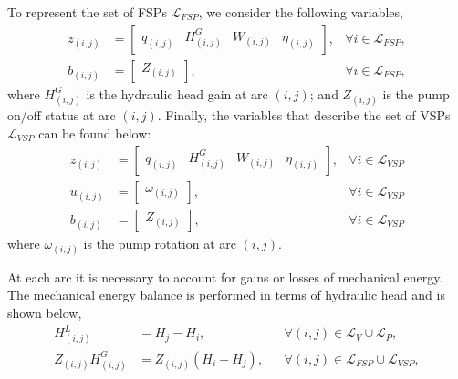     To represent the set of FSPs $\mathcal{L}_{FSP}$, we consider the following variables,
    \begin{subequations}
        \begin{alignat}{2}
            z_{(i,j)} &= \left[\begin{array}{cccc}
                q_{(i,j)} & H^G_{(i,j)} & W_{(i,j)} & \eta_{(i,j)}
            \end{array}\right], & \forall i \in \mathcal{L}_{FSP},
            \\
            b_{(i,j)} &= \left[\begin{array}{c}
                Z_{(i,j)}
            \end{array}\right], & \forall i \in \mathcal{L}_{FSP},
            \end{alignat}
    \end{subequations}
    where $H^G_{(i,j)}$ is the hydraulic head gain at arc ${(i,j)}$; 
    and $Z_{(i,j)}$ is the pump on/off status at arc ${(i,j)}$. 
    Finally, the variables that describe the set of VSPs $\mathcal{L}_{VSP}$ can be found below:
    \begin{subequations}
        \begin{alignat}{2}
            z_{(i,j)} &= \left[\begin{array}{cccc}
                q_{(i,j)} & H^G_{(i,j)} & W_{(i,j)} & \eta_{(i,j)}
            \end{array}\right], & \forall i \in \mathcal{L}_{VSP}  
            \\
            u_{(i,j)} & = \left[\begin{array}{c}
                \omega_{(i,j)}
            \end{array}\right], & \forall i \in \mathcal{L}_{VSP}  
            \\
            b_{(i,j)} &= \left[\begin{array}{ccc}
                Z_{(i,j)}
            \end{array}\right], & \forall i \in \mathcal{L}_{VSP}
            \end{alignat}
    \end{subequations}
    where $\omega_{(i,j)}$ is the pump rotation at arc $(i,j)$.
    \par At each arc it is necessary to account for gains or losses of mechanical energy. The mechanical energy balance is performed in terms of hydraulic head and is shown below,
    \begin{subequations}
        \begin{alignat}{3}
            H^L_{(i,j)} &= H_{j} - H_{i}, && \forall (i,j) \in \mathcal{L}_{V} \cup \mathcal{L}_{P}, \label{pipeline_valve:hydraulic_head_balance}
            \\
            Z_{(i,j)}H^G_{(i,j)} &= Z_{(i,j)}\left(H_{i} - H_{j}\right), && \forall (i,j) \in \mathcal{L}_{FSP}\cup \mathcal{L}_{VSP},\label{pumps:hydraulic_head_balance}
        \end{alignat}
    \end{subequations}
